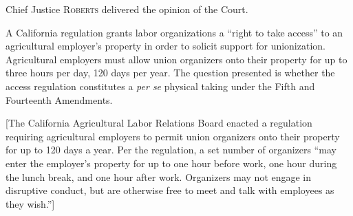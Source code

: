 

\opinion Chief Justice \textsc{Roberts} delivered the opinion of the Court.

A California regulation grants labor organizations a ``right to take access'' to
an agricultural employer's property in order to solicit support for
unionization. Agricultural employers must allow union organizers onto their
property for up to three hours per day, 120 days per year. The question
presented is whether the access regulation constitutes a \textit{per se}
physical taking under the Fifth and Fourteenth Amendments.



[The California Agricultural Labor Relations Board enacted a regulation
requiring agricultural employers to permit union organizers onto their property
for up to 120 days a year. Per the regulation, a set number of organizers ``may
enter the employer's property for up to one hour before work, one hour during
the lunch break, and one hour after work. Organizers may not engage in
disruptive conduct, but are otherwise free to meet and talk with employees as
they wish.'']


